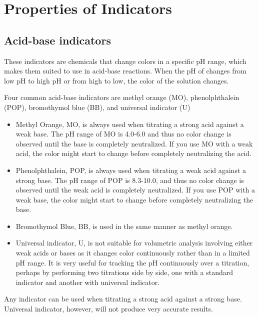 \chapter{Properties of Indicators}

\section{Acid-base indicators}
These indicators are chemicals that change colors in a specific pH range, which makes them suited to use in acid-base reactions. When the pH of changes from low pH to high pH or from high to low, the color of the solution changes. 

Four common acid-base indicators are methyl orange (MO), phenolphthalein (POP), bromothymol blue (BB), and universal indicator (U)

\begin{itemize}

\item{Methyl Orange, MO, is always used when titrating a strong acid against a weak base. The pH range of MO is 4.0-6.0 and thus no color change is observed until the base is completely neutralized. If you use MO with a weak acid, the color might start to change before completely neutralizing the acid.}

\item{Phenolphthalein, POP, is always used when titrating a weak acid against a strong base. The pH range of POP is 8.3-10.0, and thus no color change is observed until the weak acid is completely neutralized. If you use POP with a weak base, the color might start to change before completely neutralizing the base.}

\item{Bromothymol Blue, BB, is used in the same manner as methyl orange.}

\item{Universal indicator, U, is not suitable for volumetric analysis involving either weak acids or bases as it changes color continuously rather than in a limited pH range. It is very useful for tracking the pH continuously over a titration, perhaps by performing two titrations side by side, one with a standard indicator and another with universal indicator.}

\end{itemize}

Any indicator can be used when titrating a strong acid against a strong base. Universal indicator, however, will not produce very accurate results.

